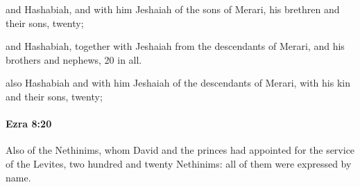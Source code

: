 			\begin{versebox}
					\item[BHS] 
					\item[LXX] 
					\item[ASV] and Hashabiah, and with him Jeshaiah of the sons of Merari, his brethren and their sons, twenty;
					\item[NIV] and Hashabiah, together with Jeshaiah from the descendants of Merari, and his brothers and nephews, 20 in all.
					\item[NRSV] also Hashabiah and with him Jeshaiah of the descendants of Merari, with his kin and their sons, twenty;
			\end{versebox}

		\paragraph{Ezra 8:20} %
			\label{EZRA-8-20}

			Also of the Nethinims, whom David and the princes had appointed for the service of the Levites, two hundred and twenty Nethinims: all of them were expressed by name.

